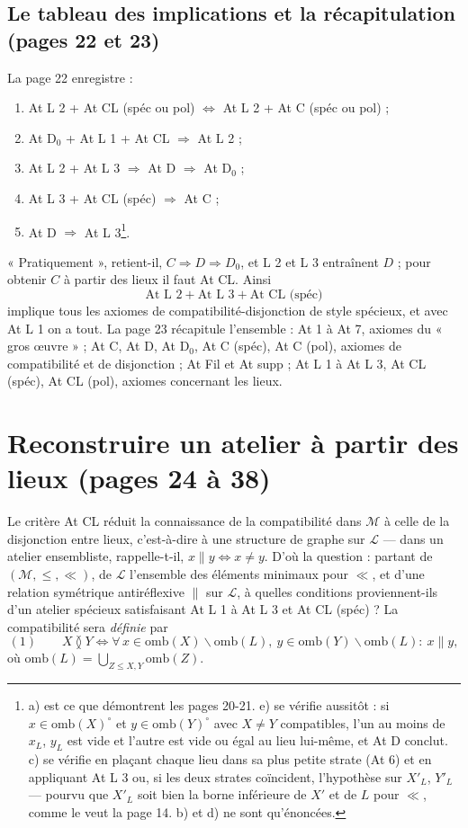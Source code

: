 \documentclass[11pt,a4paper]{article}
\begin{document}
\subsection*{Le tableau des implications et la récapitulation (pages 22 et 23)}

La page 22 enregistre :
\begin{enumerate}
\item[a)] At L 2 + At CL (spéc ou pol) $\iff$ At L 2 + At C (spéc ou pol) ;
\item[b)] At D$_{0}$ + At L 1 + At CL $\Rightarrow$ At L 2 ;
\item[c)] At L 2 + At L 3 $\Rightarrow$ At D $\Rightarrow$ At D$_{0}$ ;
\item[d)] At L 3 + At CL (spéc) $\Rightarrow$ At C ;
\item[e)] At D $\Rightarrow$ At L 3\footnote{a) est ce que démontrent les pages
20-21. e) se vérifie aussitôt : si $x \in \mathrm{omb}(X)^{\circ}$ et $y \in
\mathrm{omb}(Y)^{\circ}$ avec $X \neq Y$ compatibles, l'un au moins de $x_{L}$,
$y_{L}$ est vide et l'autre est vide ou égal au lieu lui-même, et At D conclut.
c) se vérifie en plaçant chaque lieu dans sa plus petite strate (At 6) et en
appliquant At L 3 ou, si les deux strates coïncident, l'hypothèse sur $X'_{L}$,
$Y'_{L}$ --- pourvu que $X'_{L}$ soit bien la borne inférieure de $X'$ et de $L$
pour $\ll$, comme le veut la page 14. b) et d) ne sont qu'énoncées.}.
\end{enumerate}
« Pratiquement », retient-il, $C \Rightarrow D \Rightarrow D_{0}$, et L 2 et L 3
entraînent $D$ ; pour obtenir $C$ à partir des lieux il faut At CL. Ainsi
\[
\text{At L 2} + \text{At L 3} + \text{At CL (spéc)}
\]
implique tous les axiomes de compatibilité-disjonction de style spécieux, et avec
At L 1 on a tout. La page 23 récapitule l'ensemble : At 1 à At 7, axiomes du
« gros œuvre » ; At C, At D, At D$_{0}$, At C (spéc), At C (pol), axiomes de
compatibilité et de disjonction ; At Fil et At supp ; At L 1 à At L 3, At CL
(spéc), At CL (pol), axiomes concernant les lieux.

\section*{Reconstruire un atelier à partir des lieux (pages 24 à 38)}

Le critère At CL réduit la connaissance de la compatibilité dans $\mathcal{M}$ à
celle de la disjonction entre lieux, c'est-à-dire à une structure de graphe sur
$\mathcal{L}$ --- dans un atelier ensembliste, rappelle-t-il, $x \parallel y \iff
x \neq y$. D'où la question : partant de $(\mathcal{M}, \leq, \ll)$, de
$\mathcal{L}$ l'ensemble des éléments minimaux pour $\ll$, et d'une relation
symétrique antiréflexive $\parallel$ sur $\mathcal{L}$, à quelles conditions
proviennent-ils d'un atelier spécieux satisfaisant At L 1 à At L 3 et At CL
(spéc) ? La compatibilité sera \emph{définie} par
\[
(1) \qquad X \between Y \iff \forall\, x \in \mathrm{omb}(X) \smallsetminus
\mathrm{omb}(L),\ y \in \mathrm{omb}(Y) \smallsetminus \mathrm{omb}(L) :\ x
\parallel y ,
\]
où $\mathrm{omb}(L) = \bigcup_{Z \leq X, Y} \mathrm{omb}(Z)$.
\end{document}
